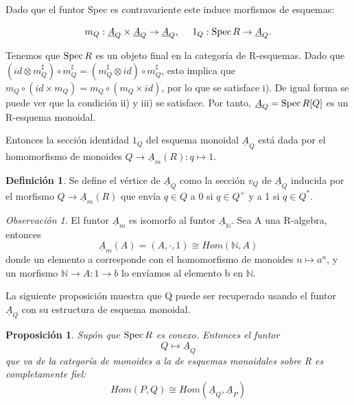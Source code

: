 \documentclass[12pt,spanish]{amsart}
\newcommand{\bb}[1]{\mathbb{#1}}
\def\Spec{\mathop{\mbox{\normalfont Spec}}\nolimits}
\newtheorem{prop}[Theorem]{Proposición}
\theoremstyle{definition}
\newtheorem{Def}[Theorem]{Definición}
\theoremstyle{remark}
\newtheorem{obs}[Theorem]{Observación}
\begin{document}
Dado que el funtor Spec es contravariente este induce morfismos de esquemas:

$$m_{Q}:\underline{A}_{Q}\times \underline{A}_{Q} \to \underline{A}_{Q}, ~~~~ 1_{Q}:\Spec{R} \to \underline{A}_{Q}.$$

Tenemos que $\Spec{R}$ es un objeto final en la categoría de R-esquemas. Dado que $(id\otimes m_{Q}^{\sharp}) \circ m_{Q}^{\sharp}=(m_{Q}^{\sharp}\otimes id) \circ m_{Q}^{\sharp}$, esto implica que $m_{Q} \circ (id\times m_{Q}) =  m_{Q} \circ (m_{Q}\times id)$, por lo que se satisface i). De igual forma se puede ver que la condición ii) y iii) se satisface. Por tanto, $\underline{A}_{Q}=\Spec{R[Q]}$ es un R-esquema monoidal.

Entonces la sección identidad $1_{Q}$ del esquema monoidal $\underline{A}_{Q}$ está dada por el homomorfismo de monoides $Q \to \underline{A}_{m}(R):q \mapsto 1$.

\begin{Def}
Se define el vértice de $\underline{A}_{Q}$ como la sección $v_{Q}$ de $\underline{A}_{Q}$ inducida por el morfismo $Q \to \underline{A}_{m}(R)$ que envía $q\in Q$ a 0 si $q\in Q^{+}$ y a 1 si $q\in Q^{\ast}$. 
\end{Def}


\begin{obs}
El funtor $\underline{A}_{m}$ es isomorfo al funtor $\underline{A}_{\bb{N}}$. Sea A una R-algebra, entonces
$$\underline{A}_{m}(A)=(A,\cdot,1) \cong Hom(\bb{N},A)$$
donde un elemento a corresponde con el homomorfismo de monoides $n \mapsto a^{n}$, y un morfismo $\bb{N} \to A:1 \to b$ lo envíamos al elemento b en $\bb{N}$. 
\end{obs}

La siguiente proposición muestra que Q puede ser recuperado usando el funtor $\underline{A}_{Q}$ con su estructura de esquema monoidal. 

\begin{prop}
Supón que $\Spec{R}$ es conexo. Entonces el funtor 
$$Q \mapsto \underline{A}_{Q}$$
que va de la categoría de monoides a la de esquemas monoidales sobre R es completamente fiel:
$$Hom(P,Q) \cong Hom(\underline{A}_{Q},\underline{A}_{P})$$
\end{prop}
\end{document}
